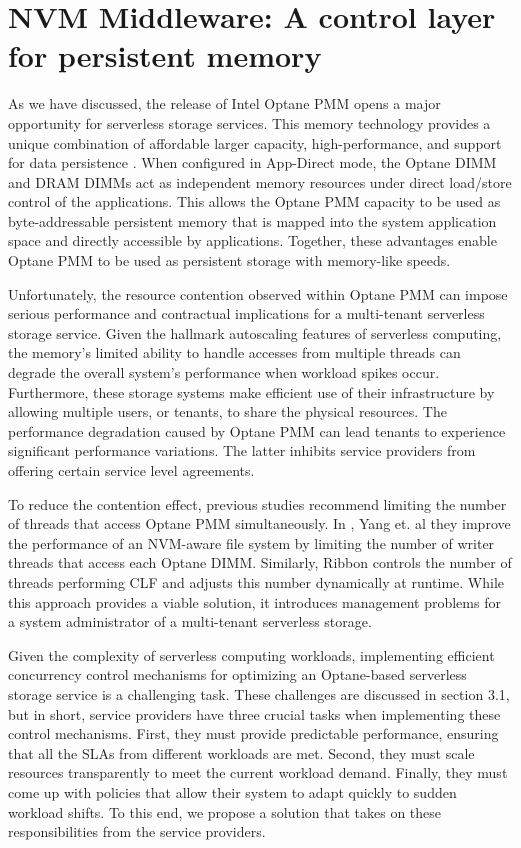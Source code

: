 \chapter[NVM Middleware: A control layer for persistent memory]{NVM Middleware: A control layer for persistent memory}

As we have discussed, the release of Intel Optane PMM opens a major opportunity for serverless storage services. This memory technology provides a unique combination of affordable larger capacity, high-performance, and support for data persistence \cite{IntelOp15:online}. When configured in App-Direct mode, the Optane DIMM and DRAM DIMMs act as independent memory resources under direct load/store control of the applications. This allows the Optane PMM capacity to be used as byte-addressable persistent memory that is mapped into the system application space and directly accessible by applications. Together, these advantages enable Optane PMM to be used as persistent storage with memory-like speeds.

Unfortunately, the resource contention observed within Optane PMM can impose serious performance and contractual implications for a multi-tenant serverless storage service. Given the hallmark autoscaling features of serverless computing, the memory’s limited ability to handle accesses from multiple threads can degrade the overall system’s performance when workload spikes occur. Furthermore, these storage systems make efficient use of their infrastructure by allowing multiple users, or tenants, to share the physical resources. The performance degradation caused by Optane PMM can lead tenants to experience significant performance variations. The latter inhibits service providers from offering certain service level agreements.

To reduce the contention effect, previous studies recommend limiting the number of threads that access Optane PMM simultaneously. In \cite{yang2020empirical}, Yang et. al they improve the performance of an NVM-aware file system by limiting the number of writer threads that access each Optane DIMM. Similarly, Ribbon \cite{wu2020ribbon} controls the number of threads performing CLF and adjusts this number dynamically at runtime. While this approach provides a viable solution, it introduces management problems for a system administrator of a multi-tenant serverless storage.

Given the complexity of serverless computing workloads, implementing efficient concurrency control mechanisms for optimizing an Optane-based serverless storage service is a challenging task. These challenges are discussed in section 3.1, but in short, service providers have three crucial tasks when implementing these control mechanisms. First, they must provide predictable performance, ensuring that all the SLAs from different workloads are met. Second, they must scale resources transparently to meet the current workload demand. Finally, they must come up with policies that allow their system to adapt quickly to sudden workload shifts. To this end, we propose a solution that takes on these responsibilities from the service providers.

